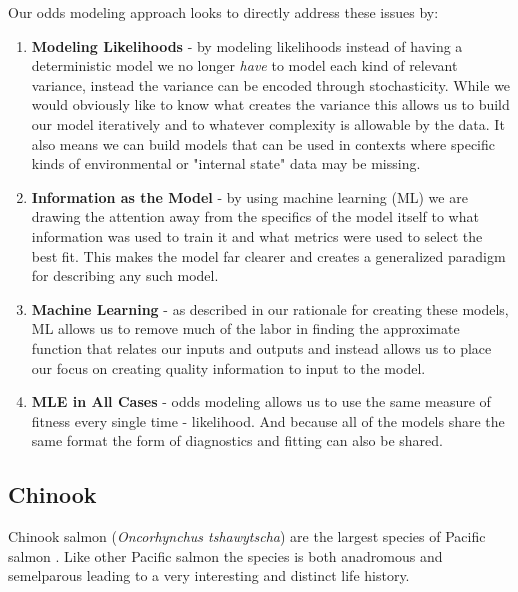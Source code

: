 \documentclass[11pt]{article}
\begin{document}
Our odds modeling approach looks to directly address these issues by:

\begin{enumerate}
\item \textbf{Modeling Likelihoods} - by modeling likelihoods instead of having a deterministic model we no longer \textit{have} to model each kind of relevant variance, instead the variance can be encoded through stochasticity. While we would obviously like to know what creates the variance this allows us to build our model iteratively and to whatever complexity is allowable by the data. It also means we can build models that can be used in contexts where specific kinds of environmental or "internal state" data may be missing.
\item \textbf{Information as the Model} - by using machine learning (ML) we are drawing the attention away from the specifics of the model itself to what information was used to train it and what metrics were used to select the best fit. This makes the model far clearer and creates a generalized paradigm for describing any such model.
\item \textbf{Machine Learning} - as described in our rationale for creating these models, ML allows us to remove much of the labor in finding the approximate function that relates our inputs and outputs and instead allows us to place our focus on creating quality information to input to the model.
\item \textbf{MLE in All Cases} - odds modeling allows us to use the same measure of fitness every single time - likelihood. And because all of the models share the same format the form of diagnostics and fitting can also be shared.
\end{enumerate}



\newpage











\subsection{Chinook}


Chinook salmon (\textit{Oncorhynchus tshawytscha}) are the largest species of Pacific salmon \cite{oceanchinook}. Like other Pacific salmon the species is both anadromous and semelparous leading to a very interesting and distinct life history. 
\end{document}
